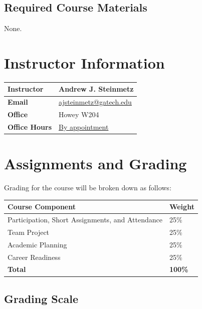\documentclass[11pt]{article}
\begin{document}
\subsection*{Required Course Materials}

None.

\section*{Instructor Information}

\begin{tabularx}{\textwidth}{>{\bfseries}p{} X}
\toprule
Instructor & Andrew J. Steinmetz \\
\midrule
Email & \href{mailto:ajsteinmetz@gatech.edu}{ajsteinmetz@gatech.edu} \\
\midrule
Office & Howey W204 \\
\midrule
Office Hours &
\href{https://outlook.office.com/bookwithme/user/118287044b844adb8cb5cfaadd54546f@gatech.edu?anonymous\&ismsaljsauthenabled\&ep=plink}
{By appointment} \\
\bottomrule
\end{tabularx}

\newpage

\section*{Assignments and Grading}

Grading for the course will be broken down as follows:

\begin{center}
\renewcommand{\arraystretch}{1.15}
\begin{tabularx}{0.98\textwidth}{X p{}}
\toprule
\textbf{Course Component} & \textbf{Weight} \\
\midrule
Participation, Short Assignments, and Attendance & 25\% \\
Team Project & 25\% \\
Academic Planning & 25\% \\
Career Readiness & 25\% \\
\midrule
\textbf{Total} & \textbf{100\%} \\
\bottomrule
\end{tabularx}
\renewcommand{\arraystretch}{1.0}
\end{center}

\subsection*{Grading Scale}
\end{document}
